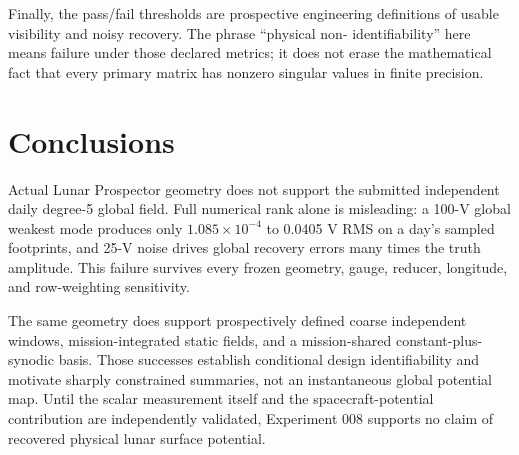 \documentclass[11pt]{article}
\begin{document}
Finally, the pass/fail thresholds are prospective engineering definitions of
usable visibility and noisy recovery.  The phrase ``physical non-
identifiability'' here means failure under those declared metrics; it does not
erase the mathematical fact that every primary matrix has nonzero singular
values in finite precision.

\section{Conclusions}

Actual Lunar Prospector geometry does not support the submitted independent
daily degree-5 global field.  Full numerical rank alone is misleading: a
100-V global weakest mode produces only $1.085\times10^{-4}$ to 0.0405 V RMS
on a day's sampled footprints, and 25-V noise drives global recovery errors
many times the truth amplitude.  This failure survives every frozen geometry,
gauge, reducer, longitude, and row-weighting sensitivity.

The same geometry does support prospectively defined coarse independent
windows, mission-integrated static fields, and a mission-shared
constant-plus-synodic basis.  Those successes establish conditional design
identifiability and motivate sharply constrained summaries, not an
instantaneous global potential map.  Until the scalar measurement itself and
the spacecraft-potential contribution are independently validated, Experiment
008 supports no claim of recovered physical lunar surface potential.
\end{document}
